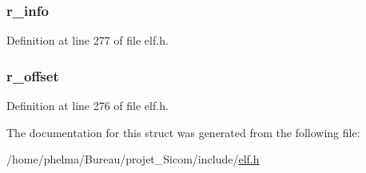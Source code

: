 \hypertarget{struct_elf64___rela_a3876714743e1e751d96819f888a09158}{
\subsubsection[{r\-\_\-info}]{ r\-\_\-info}}\label{struct_elf64___rela_a3876714743e1e751d96819f888a09158}


Definition at line 277 of file elf.\-h.

\hypertarget{struct_elf64___rela_a21afad4c85269dd5b12d5c836508cc36}{
\subsubsection[{r\-\_\-offset}]{ r\-\_\-offset}}\label{struct_elf64___rela_a21afad4c85269dd5b12d5c836508cc36}


Definition at line 276 of file elf.\-h.



The documentation for this struct was generated from the following file\-:\begin{DoxyCompactItemize}
\item 
/home/phelma/\-Bureau/projet\-\_\-\-Sicom/include/\hyperlink{elf_8h}{elf.\-h}\end{DoxyCompactItemize}
